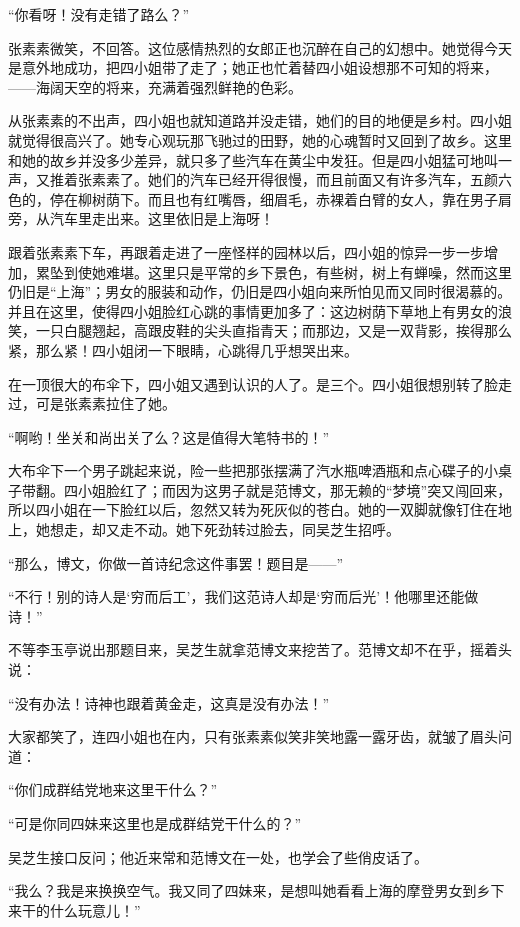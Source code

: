 \par “你看呀！没有走错了路么？”
\par 张素素微笑，不回答。这位感情热烈的女郎正也沉醉在自己的幻想中。她觉得今天是意外地成功，把四小姐带了走了；她正也忙着替四小姐设想那不可知的将来，——海阔天空的将来，充满着强烈鲜艳的色彩。
\par 从张素素的不出声，四小姐也就知道路并没走错，她们的目的地便是乡村。四小姐就觉得很高兴了。她专心观玩那飞驰过的田野，她的心魂暂时又回到了故乡。这里和她的故乡并没多少差异，就只多了些汽车在黄尘中发狂。但是四小姐猛可地叫一声，又推着张素素了。她们的汽车已经开得很慢，而且前面又有许多汽车，五颜六色的，停在柳树荫下。而且也有红嘴唇，细眉毛，赤裸着白臂的女人，靠在男子肩旁，从汽车里走出来。这里依旧是上海呀！
\par 跟着张素素下车，再跟着走进了一座怪样的园林以后，四小姐的惊异一步一步增加，累坠到使她难堪。这里只是平常的乡下景色，有些树，树上有蝉噪，然而这里仍旧是“上海”；男女的服装和动作，仍旧是四小姐向来所怕见而又同时很渴慕的。并且在这里，使得四小姐脸红心跳的事情更加多了：这边树荫下草地上有男女的浪笑，一只白腿翘起，高跟皮鞋的尖头直指青天；而那边，又是一双背影，挨得那么紧，那么紧！四小姐闭一下眼睛，心跳得几乎想哭出来。
\par 在一顶很大的布伞下，四小姐又遇到认识的人了。是三个。四小姐很想别转了脸走过，可是张素素拉住了她。
\par “啊哟！坐关和尚出关了么？这是值得大笔特书的！”
\par 大布伞下一个男子跳起来说，险一些把那张摆满了汽水瓶啤酒瓶和点心碟子的小桌子带翻。四小姐脸红了；而因为这男子就是范博文，那无赖的“梦境”突又闯回来，所以四小姐在一下脸红以后，忽然又转为死灰似的苍白。她的一双脚就像钉住在地上，她想走，却又走不动。她下死劲转过脸去，同吴芝生招呼。
\par “那么，博文，你做一首诗纪念这件事罢！题目是——”
\par “不行！别的诗人是‘穷而后工’，我们这范诗人却是‘穷而后光’！他哪里还能做诗！”
\par 不等李玉亭说出那题目来，吴芝生就拿范博文来挖苦了。范博文却不在乎，摇着头说：
\par “没有办法！诗神也跟着黄金走，这真是没有办法！”
\par 大家都笑了，连四小姐也在内，只有张素素似笑非笑地露一露牙齿，就皱了眉头问道：
\par “你们成群结党地来这里干什么？”
\par “可是你同四妹来这里也是成群结党干什么的？”
\par 吴芝生接口反问；他近来常和范博文在一处，也学会了些俏皮话了。
\par “我么？我是来换换空气。我又同了四妹来，是想叫她看看上海的摩登男女到乡下来干的什么玩意儿！”
